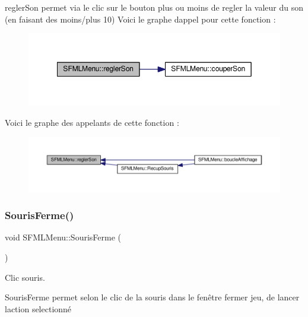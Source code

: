regler\+Son permet via le clic sur le bouton plus ou moins de regler la valeur du son (en faisant des moins/plus 10) Voici le graphe d\textquotesingle{}appel pour cette fonction \+:\nopagebreak
\begin{figure}[H]
\begin{center}
\leavevmode
\includegraphics[width=349pt]{class_s_f_m_l_menu_a82219455a672aebd4f214ca006dfd7c0_cgraph}
\end{center}
\end{figure}
Voici le graphe des appelants de cette fonction \+:\nopagebreak
\begin{figure}[H]
\begin{center}
\leavevmode
\includegraphics[width=350pt]{class_s_f_m_l_menu_a82219455a672aebd4f214ca006dfd7c0_icgraph}
\end{center}
\end{figure}
\mbox{\label{class_s_f_m_l_menu_a18287dfc6a6f62b1a84e79ab95311a49}} 
\subsubsection{\texorpdfstring{Souris\+Ferme()}{SourisFerme()}}
{\footnotesize\ttfamily void S\+F\+M\+L\+Menu\+::\+Souris\+Ferme (\begin{DoxyParamCaption}{ }\end{DoxyParamCaption})\hspace{0.3cm}{\ttfamily [private]}}



Clic souris. 

Souris\+Ferme permet selon le clic de la souris dans le fenêtre fermer jeu, de lancer l\textquotesingle{}action selectionné 

